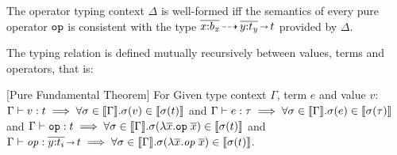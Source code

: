 \begin{definition}
  \label{lemma:built-in-pure-typing}
  The operator typing context $\Delta$ is well-formed
  iff the semantics of every pure operator $\boldsymbol{{\tt op}}$ is
  consistent with the type $\overline{x{:}b_{\mathit{x}}}{\,\dashrightarrow\,}
  \overline{y{:}t_{\mathit{y}}}{\,\shortrightarrow\,} t$ provided by $\Delta$.
  \vspace{-.4cm} \par{} \vspace{-.4cm} \par\nobreak\noindent
\end{definition}

The typing relation is defined mutually recursively between values, terms and operators, that is:

\begin{theorem}\label{theorem:fundamental-full}[Pure Fundamental Theorem] For Given type context $\Gamma$, term $e$ and value $v$:
  $\Gamma \vdash v: t \implies \forall \sigma \in \llbracket {\Gamma} \rrbracket. \sigma(v) \in \llbracket {\sigma(t)} \rrbracket$ and
  $\Gamma \vdash e : \tau \implies \forall \sigma \in \llbracket {\Gamma} \rrbracket. \sigma(e) \in \llbracket {\sigma(\tau)} \rrbracket$ and 
  $\Gamma \vdash \boldsymbol{{\tt op}} : t \implies \forall \sigma \in \llbracket {\Gamma} \rrbracket. \sigma(\lambda \overline{x}.\boldsymbol{{\tt op}}\; \overline{x}) \in \llbracket {\sigma(t)} \rrbracket$ and 
  $\Gamma \vdash \mathit{op} : \overline{y{:}t_i}{\,\shortrightarrow\,} t \implies \forall \sigma \in \llbracket {\Gamma} \rrbracket. \sigma(\lambda \overline{x}.\mathit{op}\; \overline{x}) \in \llbracket {\sigma(t)} \rrbracket$.
\end{theorem}

